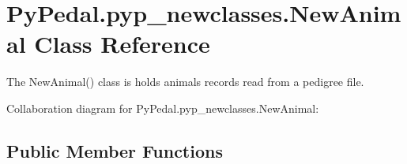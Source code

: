 \hypertarget{classPyPedal_1_1pyp__newclasses_1_1NewAnimal}{
\section{PyPedal.pyp\_\-newclasses.NewAnimal Class Reference}
\label{classPyPedal_1_1pyp__newclasses_1_1NewAnimal}
}


The NewAnimal() class is holds animals records read from a pedigree file.  




Collaboration diagram for PyPedal.pyp\_\-newclasses.NewAnimal:
\subsection*{Public Member Functions}
